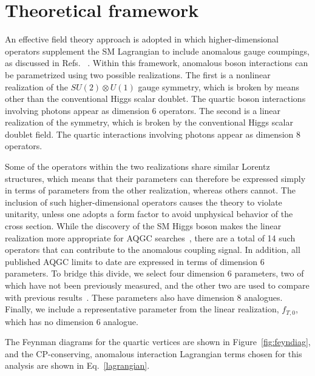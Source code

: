 \section{Theoretical framework}
\label{sec:aQGCth}

An effective field theory approach is adopted in which
higher-dimensional operators supplement the SM Lagrangian to include anomalous gauge coumpings, as discussed
in Refs. ~\cite{Eboli:2006wa,Belanger:1999,Bosonic:2004PRD}. Within this
framework, anomalous boson interactions can be parametrized using two
possible realizations. The first is a nonlinear realization of the
$SU(2)\otimes U(1)$ gauge symmetry, which is broken by means other
than the conventional Higgs scalar doublet. The quartic boson
interactions involving photons appear as dimension 6 operators. The
second is a linear realization of the symmetry, which is broken by the
conventional Higgs scalar doublet field. The quartic interactions
involving photons appear as dimension 8 operators. 

Some of the operators within the two realizations share similar Lorentz structures,
which means that their parameters can therefore be expressed simply in
terms of parameters from the other realization, whereas others
cannot. The inclusion of such higher-dimensional operators causes the
theory to violate unitarity, unless one adopts a form factor to avoid
unphysical behavior of the cross section. While the discovery of the SM Higgs boson makes the linear realization
more appropriate for AQGC searches~\cite{Aihara:1995iq,Baak:2013fwa},
there are a total of 14 such operators that can contribute to the
anomalous coupling signal. In addition, all published AQGC limits to
date are expressed in terms of dimension 6 parameters. To bridge this
divide, we select four dimension 6 parameters, two of which have not
been previously measured, and the other two are used to compare with
previous results~\cite{Belanger:1999,Achard:2001eg}. These parameters
also have dimension 8 analogues. Finally, we include a representative
parameter from the linear realization, $f_{T,0}$, which has no
dimension 6 analogue.

The Feynman diagrams for the quartic vertices are shown in
Figure~\ref{fig:feyndiag}, and the CP-conserving, anomalous
interaction Lagrangian terms chosen for this analysis are shown in
Eq.~\eqref{lagrangian}.

